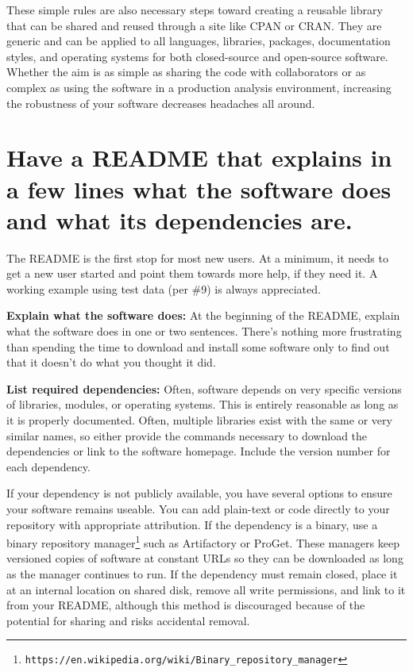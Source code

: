 \documentclass[10pt,letterpaper]{article}
\newcommand{\withurl}[2]{{#1}\footnote{\texttt{#2}}}
\begin{document}
These simple rules are also necessary steps toward creating a reusable
library that can be shared and reused through a site like CPAN or CRAN.  They are
generic and can be applied to all languages, libraries, packages,
documentation styles, and operating systems for both closed-source and
open-source software.  
Whether the aim is as simple as sharing the
code with collaborators or as complex as using the software in a
production analysis environment, increasing the robustness of your
software decreases headaches all around.

\section{Have a README that explains in a few lines what the software does and what its dependencies are.}

The README is the first stop for most new users.
At a minimum, it needs to get a new user started and point them towards more
help, if they need it.
A working example using test data (per
\#9) is always appreciated.

\textbf{Explain what the software does:} At the beginning of the README,
explain what the software does in one or two sentences.
There's nothing more frustrating
than spending the time to download and install some software only to
find out that it doesn't do what you thought it did.

\textbf{List required dependencies:} Often, software depends on very
specific versions of libraries, modules, or operating systems. This is
entirely reasonable as long as it is properly documented. Often,
multiple libraries exist with the same or very similar names, so
either provide the commands necessary to download the dependencies or
link to the software homepage. Include the version number for each
dependency.  

If your dependency is not publicly available,
you have several options to ensure your software remains useable.
You can add plain-text or code directly to
your repository with appropriate attribution. If the dependency is a binary, use a
\withurl{binary repository manager}{https://en.wikipedia.org/wiki/Binary\_repository\_manager}
such as Artifactory or ProGet. These managers keep versioned copies of
software at constant URLs so they can be downloaded as long as the
manager continues to run. If the dependency must remain closed, place it at an
internal location on shared disk, remove all write permissions, and
link to it from your README, although this method is 
discouraged because of the potential for sharing and risks accidental removal.
\end{document}
